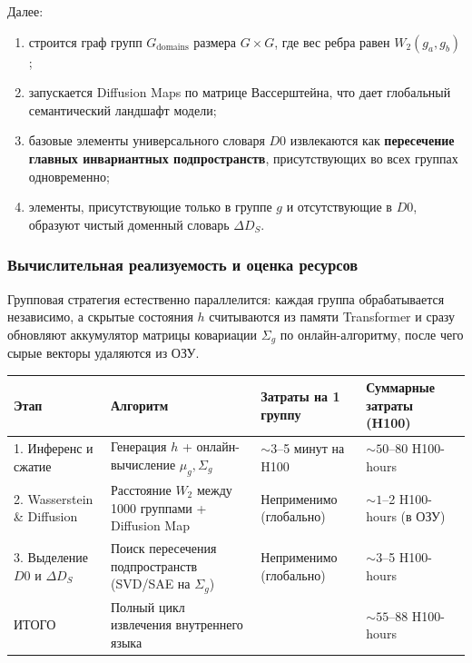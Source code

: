 \documentclass[11pt,a4paper]{article}
\begin{document}
Далее:
\begin{enumerate}
    \item строится граф групп $G_{\text{domains}}$ размера $G\times G$, где вес ребра равен $W_2(g_a,g_b)$;
    \item запускается Diffusion Maps по матрице Вассерштейна, что дает глобальный семантический ландшафт модели;
    \item базовые элементы универсального словаря $D0$ извлекаются как \textbf{пересечение главных инвариантных подпространств}, присутствующих во всех группах одновременно;
    \item элементы, присутствующие только в группе $g$ и отсутствующие в $D0$, образуют чистый доменный словарь $\Delta D_S$.
\end{enumerate}

\subsubsection*{Вычислительная реализуемость и оценка ресурсов}

Групповая стратегия естественно параллелится: каждая группа обрабатывается независимо, а скрытые состояния $h$ считываются из памяти Transformer и сразу обновляют аккумулятор матрицы ковариации $\Sigma_g$ по онлайн-алгоритму, после чего сырые векторы удаляются из ОЗУ.

\begin{table}[h!]
\centering
\small
\begin{tabular}{p{3.0cm} p{5.1cm} p{3.3cm} p{3.2cm}}
\toprule
\textbf{Этап} & \textbf{Алгоритм} & \textbf{Затраты на 1 группу} & \textbf{Суммарные затраты (H100)} \\
\midrule
1. Инференс и сжатие & Генерация $h$ + онлайн-вычисление $\mu_g,\Sigma_g$ & $\sim3$--5 минут на H100 & $\sim50$--80 H100-hours \\
2. Wasserstein \& Diffusion & Расстояние $W_2$ между 1000 группами + Diffusion Map & Неприменимо (глобально) & $\sim1$--2 H100-hours (в ОЗУ) \\
3. Выделение $D0$ и $\Delta D_S$ & Поиск пересечения подпространств (SVD/SAE на $\Sigma_g$) & Неприменимо (глобально) & $\sim3$--5 H100-hours \\
\midrule
ИТОГО & Полный цикл извлечения внутреннего языка & & $\sim55$--88 H100-hours \\
\bottomrule
\end{tabular}
\end{table}
\end{document}
